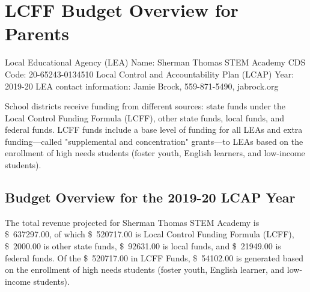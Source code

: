 \documentclass{article}
\newcommand{\pieslicecaption}[3]{{#1, \dollar{#2}, \SI{#3}{\percent}}}
\newcommand{\dollar}[1]{\SI{#1}[\$]{}}
\begin{document}
\section{LCFF Budget Overview for Parents}
Local Educational Agency (LEA) Name: Sherman Thomas STEM Academy\newline
CDS Code: 20-65243-0134510\newline
Local Control and Accountability Plan (LCAP) Year: 2019-20\newline
LEA contact information: Jamie Brock, 559-871-5490, jabrock\@stcsca.org\newline

School districts receive funding from different sources: state funds under the Local Control Funding Formula (LCFF), other state funds, local funds, and federal funds. LCFF funds include a base level of funding for all LEAs and extra funding---called "supplemental and concentration" grants---to LEAs based on the enrollment of high needs students (foster youth, English learners, and low-income students).

\subsection{Budget Overview for the 2019-20 LCAP Year}
\begin{figure}

\end{figure}

The total revenue projected for Sherman Thomas STEM Academy is \dollar{637297.00}, of which \dollar{520717.00} is Local Control Funding Formula (LCFF), \dollar{2000.00} is other state funds, \dollar{92631.00} is local funds, and \dollar{21949.00} is federal funds. Of the \dollar{520717.00} in LCFF Funds, \dollar{54102.00} is generated based on the enrollment of high needs students (foster youth, English learner, and low-income students).
\end{document}
